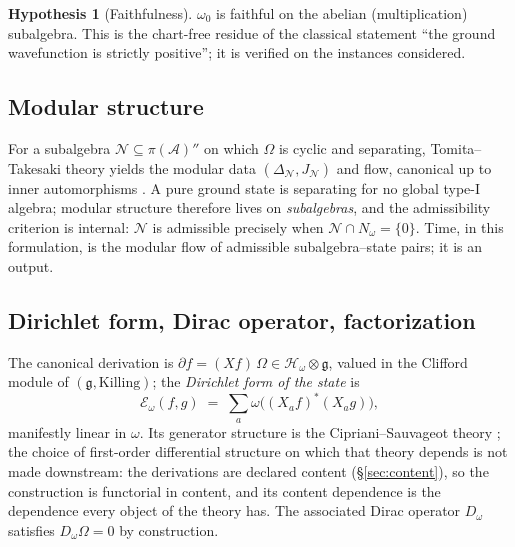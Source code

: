 \documentclass[11pt]{article}
\theoremstyle{definition}
\newtheorem{hypothesis}[theorem]{Hypothesis}
\theoremstyle{remark}
\newcommand{\A}{\mathcal{A}}
\newcommand{\w}{\omega_0}
\newcommand{\Hw}{\mathcal{H}_{\omega}}
\newcommand{\g}{\mathfrak{g}}
\newcommand{\E}{\mathcal{E}}
\begin{document}
\begin{hypothesis}[Faithfulness]\label{hyp:faithful}
$\w$ is faithful on the abelian (multiplication) subalgebra.  This is the
chart-free residue of the classical statement ``the ground wavefunction
is strictly positive''; it is verified on the instances considered.
\end{hypothesis}

\subsection{Modular structure}\label{sec:modular}
For a subalgebra $\mathcal N \subseteq \pi(\A)''$ on which $\Omega$ is
cyclic and separating, Tomita--Takesaki theory yields the modular data
$(\Delta_{\mathcal N}, J_{\mathcal N})$ and flow, canonical up to inner
automorphisms \cite{takesaki}.  A pure ground state is separating for no
global type-I algebra; modular structure therefore lives on
\emph{subalgebras}, and the admissibility criterion is internal:
$\mathcal N$ is admissible precisely when $\mathcal N \cap N_\omega =
\{0\}$.  Time, in this formulation, is the modular flow of admissible
subalgebra--state pairs; it is an output.

\subsection{Dirichlet form, Dirac operator, factorization}
\label{sec:dirichlet}
The canonical derivation is $\partial f = (X f)\,\Omega \in \Hw \otimes
\g$, valued in the Clifford module of $(\g, \mathrm{Killing})$; the
\emph{Dirichlet form of the state} is
\[
\E_\omega(f,g) \;=\; \sum_a \omega\big((X_a f)^{*}(X_a g)\big),
\]
manifestly linear in $\omega$.  Its generator structure is the
Cipriani--Sauvageot theory \cite{cipriani}; the choice of first-order
differential structure on which that theory depends is not made
downstream: the derivations are declared content (\S\ref{sec:content}),
so the construction is functorial in content, and its content dependence
is the dependence every object of the theory has.  The associated Dirac
operator $D_\omega$ satisfies $D_\omega \Omega = 0$ by construction.
\end{document}
